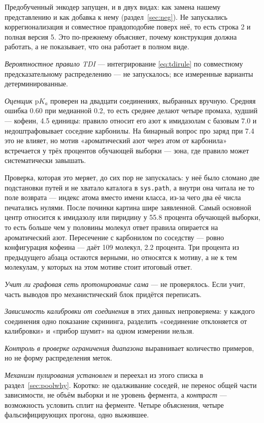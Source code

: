 Предобученный энкодер запущен, и в двух видах: как замена нашему представлению и как добавка
к нему (раздел~\ref{sec:neg}). Не запускались коррегионализация и совместное правдоподобие
поверх неё, то есть строка 2 и полная версия 5. Это по-прежнему объясняет, почему конструкция
должна работать, а не показывает, что она работает в полном виде.

\emph{Вероятностное правило TDI} --- интегрирование \eqref{eq:tdirule} по совместному предсказательному
распределению --- не запускалось; все измеренные варианты детерминированные.

\emph{Оценщик $\mathrm{p}K_a$} проверен на двадцати соединениях, выбранных вручную. Средняя ошибка 0.60
при медианной 0.2, то есть среднее делают четыре промаха, худший --- кофеин, 4.5 единицы: правило относит
его азот к имидазолам с базовым 7.0 и недоштрафовывает соседние карбонилы. На бинарный вопрос про заряд
при 7.4 это не влияет, но мотив «ароматический азот через атом от карбонила» встречается у трёх процентов
обучающей выборки --- зона, где правило может систематически завышать.

Проверка, которая это меряет, до сих пор не запускалась: у неё было сломано две подстановки путей и не
хватало каталога в \texttt{sys.path}, а внутри она читала не то поле возврата --- индекс атома вместо
имени класса, из-за чего два её числа печатались нулями. После починки картина шире заявленной.
Самый основной центр относится к имидазолу или пиридину у 55.8 процента обучающей выборки, то есть
больше чем у половины молекул ответ правила опирается на ароматический азот. Пересечение с карбонилом
по соседству --- ровно конфигурация кофеина --- даёт 109 молекул, 2.2 процента. Три процента из
предыдущего абзаца остаются верными, но относятся к мотиву, а не к тем молекулам, у которых на этом
мотиве стоит итоговый ответ.

\emph{Учит ли графовая сеть протонирование сама} --- не проверялось. Если учит, часть выводов
про механистический блок придётся переписать.

\emph{Зависимость калибровки от соединения} в этих данных непроверяема: у каждого соединения одно показание
скрининга, разделить «соединение отклоняется от калибровки» и «прибор шумит» на одном измерении нельзя.

\emph{Контроль в проверке ограничения диапазона} выравнивает количество примеров, но не форму
распределения меток.

\emph{Механизм пулирования установлен} и переехал из этого списка в
раздел~\ref{sec:poolwhy}. Коротко: не одалживание соседей, не перенос общей части зависимости,
не объём выборки и не уровень фермента, а \emph{контраст} --- возможность условить сплит на
ферменте. Четыре объяснения, четыре фальсифицирующих прогона, одно выжившее.

